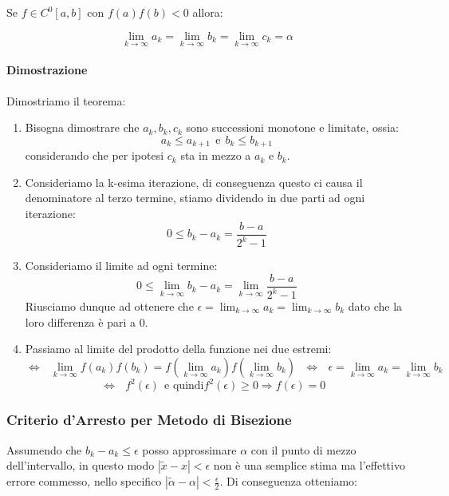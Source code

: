 \documentclass{article}
\begin{document}
Se $f \in C^{0}[a,b]$ con $f(a)f(b) < 0$ allora:

\[ \lim_{k \rightarrow \infty} a_{k} = \lim_{k \rightarrow \infty} b_{k} = \lim_{k \rightarrow \infty} c_{k} = \alpha \]

\paragraph{Dimostrazione} Dimostriamo il teorema:

\begin{enumerate}
    \item Bisogna dimostrare che $a_{k}, b_{k}, c_{k}$ sono successioni monotone e limitate, ossia:
    \[ a_{k} \leq a_{k+1} \:\: \text{e} \:\: b_{k} \leq b_{k+1} \]
    considerando che per ipotesi $c_{k}$ sta in mezzo a $a_{k}$ e $b_{k}$.
    \item Consideriamo la k-esima iterazione, di conseguenza questo ci causa il denominatore al terzo termine, stiamo dividendo in due parti ad ogni iterazione:
    \[ 0 \leq b_{k} - a_{k} = \frac{b - a}{2^{k}-1} \]
    \item Consideriamo il limite ad ogni termine:
    \[ 0 \leq \lim_{k \rightarrow \infty} b_{k} - a_{k} = \lim_{k \rightarrow \infty} \frac{b - a}{2^{k}-1} \]
    Riusciamo dunque ad ottenere che $\epsilon = \lim_{k \rightarrow \infty} a_{k} = \lim_{k \rightarrow \infty} b_{k}$ dato che la loro differenza è pari a $0$.
    \item Passiamo al limite del prodotto della funzione nei due estremi:
    \[ \Leftrightarrow \:\:\: \lim_{k \rightarrow \infty} f(a_{k})f(b_{k}) = f(\lim_{k \rightarrow \infty}a_{k})f(\lim_{k \rightarrow \infty}b_{k}) \:\:\: \Leftrightarrow \:\:\: \epsilon = \lim_{k \rightarrow \infty} a_{k} = \lim_{k \rightarrow \infty} b_{k} \]
    \[ \Leftrightarrow \:\:\: f^{2}(\epsilon) \:\: \text{e quindi} f^{2}(\epsilon) \geq 0 \Rightarrow \boxed{f(\epsilon) = 0} \:\:\: \boxed{} \]
\end{enumerate}

\subsubsection{Criterio d'Arresto per Metodo di Bisezione}

Assumendo che $b_{k} - a_{k} \leq \epsilon$ posso approssimare $\alpha$ con il punto di mezzo dell'intervallo, in questo modo $| \tilde{x} - x | < \epsilon$ non è una semplice stima ma l'effettivo errore commesso, nello specifico $| \tilde{\alpha} - \alpha | < \frac{\epsilon}{2}$.
Di conseguenza otteniamo:
\end{document}
